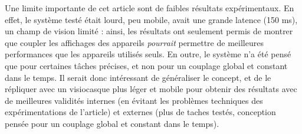 Une limite importante de cet article sont de faibles résultats expérimentaux. En effet, le système testé était lourd, peu mobile, avait une grande latence (150 ms), un champ de vision limité : ainsi, les résultats ont seulement permis de montrer que coupler les affichages des appareils \emph{pourrait} permettre de meilleures performances que les appareils utilisés seuls. En outre, le système n'a été pensé que pour certaines tâches précises, et non pour un couplage global et constant dans le temps. Il serait donc intéressant de généraliser le concept, et de le répliquer avec un visiocasque plus léger et mobile pour obtenir des résultats avec de meilleures validités internes (en évitant les problèmes techniques des expérimentations de l'article) et externes (plus de taches testés, conception pensée pour un couplage global et constant dans le temps).


